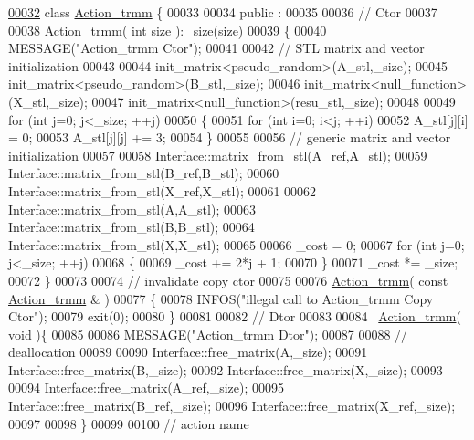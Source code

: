 \begin{DoxyCode}
\hyperlink{class_action__trmm}{00032} \textcolor{keyword}{class }\hyperlink{class_action__trmm}{Action\_trmm} \{
00033 
00034 public :
00035 
00036   \textcolor{comment}{// Ctor}
00037 
00038   \hyperlink{class_action__trmm}{Action\_trmm}( \textcolor{keywordtype}{int} size ):\_size(size)
00039   \{
00040     MESSAGE(\textcolor{stringliteral}{"Action\_trmm Ctor"});
00041 
00042     \textcolor{comment}{// STL matrix and vector initialization}
00043 
00044     init\_matrix<pseudo\_random>(A\_stl,\_size);
00045     init\_matrix<pseudo\_random>(B\_stl,\_size);
00046     init\_matrix<null\_function>(X\_stl,\_size);
00047     init\_matrix<null\_function>(resu\_stl,\_size);
00048 
00049     \textcolor{keywordflow}{for} (\textcolor{keywordtype}{int} j=0; j<\_size; ++j)
00050     \{
00051       \textcolor{keywordflow}{for} (\textcolor{keywordtype}{int} i=0; i<j; ++i)
00052         A\_stl[j][i] = 0;
00053       A\_stl[j][j] += 3;
00054     \}
00055 
00056     \textcolor{comment}{// generic matrix and vector initialization}
00057 
00058     Interface::matrix\_from\_stl(A\_ref,A\_stl);
00059     Interface::matrix\_from\_stl(B\_ref,B\_stl);
00060     Interface::matrix\_from\_stl(X\_ref,X\_stl);
00061 
00062     Interface::matrix\_from\_stl(A,A\_stl);
00063     Interface::matrix\_from\_stl(B,B\_stl);
00064     Interface::matrix\_from\_stl(X,X\_stl);
00065 
00066     \_cost = 0;
00067     \textcolor{keywordflow}{for} (\textcolor{keywordtype}{int} j=0; j<\_size; ++j)
00068     \{
00069       \_cost += 2*j + 1;
00070     \}
00071     \_cost *= \_size;
00072   \}
00073 
00074   \textcolor{comment}{// invalidate copy ctor}
00075 
00076   \hyperlink{class_action__trmm}{Action\_trmm}( \textcolor{keyword}{const}  \hyperlink{class_action__trmm}{Action\_trmm} & )
00077   \{
00078     INFOS(\textcolor{stringliteral}{"illegal call to Action\_trmm Copy Ctor"});
00079     exit(0);
00080   \}
00081 
00082   \textcolor{comment}{// Dtor}
00083 
00084   ~\hyperlink{class_action__trmm}{Action\_trmm}( \textcolor{keywordtype}{void} )\{
00085 
00086     MESSAGE(\textcolor{stringliteral}{"Action\_trmm Dtor"});
00087 
00088     \textcolor{comment}{// deallocation}
00089 
00090     Interface::free\_matrix(A,\_size);
00091     Interface::free\_matrix(B,\_size);
00092     Interface::free\_matrix(X,\_size);
00093 
00094     Interface::free\_matrix(A\_ref,\_size);
00095     Interface::free\_matrix(B\_ref,\_size);
00096     Interface::free\_matrix(X\_ref,\_size);
00097 
00098   \}
00099 
00100   \textcolor{comment}{// action name}

\end{DoxyCode}
